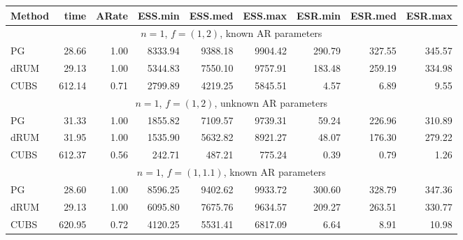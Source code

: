 \documentclass[12pt]{article}
\begin{document}
\begin{table}
\small
\centering
\begin{tabular}{l r r r r r r r r } 
         Method  &    time  &   ARate  &  ESS.min  &  ESS.med  &  ESS.max  & ESR.min  &  ESR.med  &  ESR.max  \\ 

\hline
\hline
 \multicolumn{9}{c}{$n=1$, $f = (1,2)$, known AR parameters} \\
\hline
             PG   &    28.66 &     1.00 &   8333.94 &   9388.18 &   9904.42 &    290.79 &    327.55 &    345.57 \\ 
           dRUM   &    29.13 &     1.00 &   5344.83 &   7550.10 &   9757.91 &    183.48 &    259.19 &    334.98 \\ 
           CUBS   &   612.14 &     0.71 &   2799.89 &   4219.25 &   5845.51 &      4.57 &      6.89 &      9.55
\\ %

\hline
 \multicolumn{9}{c}{$n=1$, $f = (1,2)$, unknown AR parameters} \\
\hline
             PG   &    31.33 &     1.00 &   1855.82 &   7109.57 &   9739.31 &     59.24 &    226.96 &    310.89 \\ 
           dRUM   &    31.95 &     1.00 &   1535.90 &   5632.82 &   8921.27 &     48.07 &    176.30 &    279.22 \\ 
           CUBS   &   612.37 &     0.56 &    242.71 &    487.21 &    775.24 &      0.39 &      0.79 &      1.26
 \\ %

\hline
\multicolumn{9}{c}{$n=1$, $f = (1,1.1)$, known AR parameters} \\
\hline
             PG   &    28.60 &     1.00 &   8596.25 &   9402.62 &   9933.72 &    300.60 &    328.79 &    347.36 \\ 
           dRUM   &    29.13 &     1.00 &   6095.80 &   7675.76 &   9634.57 &    209.27 &    263.51 &    330.77 \\ 
           CUBS   &   620.95 &     0.72 &   4120.25 &   5531.41 &   6817.09 &      6.64 &      8.91 &     10.98
 \\ %



\end{tabular}
\end{table}
\end{document}
